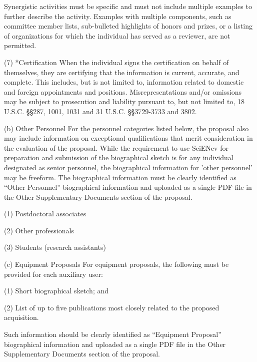 {Synergistic activities must be specific and must not include multiple examples to further describe the activity. Examples with multiple components, such as committee member lists, sub-bulleted highlights of honors and prizes, or a listing of organizations for which the individual has served as a reviewer, are not permitted.

(7) *Certification
When the individual signs the certification on behalf of themselves, they are certifying that the information is current, accurate, and complete. This includes, but is not limited to, information related to domestic and foreign appointments and positions. Misrepresentations and/or omissions may be subject to prosecution and liability pursuant to, but not limited to, 18 U.S.C. §§287, 1001, 1031 and 31 U.S.C. §§3729-3733 and 3802.

(b) Other Personnel
For the personnel categories listed below, the proposal also may include information on exceptional qualifications that merit consideration in the evaluation of the proposal. While the requirement to use SciENcv for preparation and submission of the biographical sketch is for any individual designated as senior personnel, the biographical information for 'other personnel' may be freeform. The biographical information must be clearly identified as “Other Personnel” biographical information and uploaded as a single PDF file in the Other Supplementary Documents section of the proposal.

(1) Postdoctoral associates

(2) Other professionals

(3) Students (research assistants)

(c) Equipment Proposals
For equipment proposals, the following must be provided for each auxiliary user:

(1) Short biographical sketch; and

(2) List of up to five publications most closely related to the proposed acquisition.

Such information should be clearly identified as “Equipment Proposal” biographical information and uploaded as a single PDF file in the Other Supplementary Documents section of the proposal.
	}
